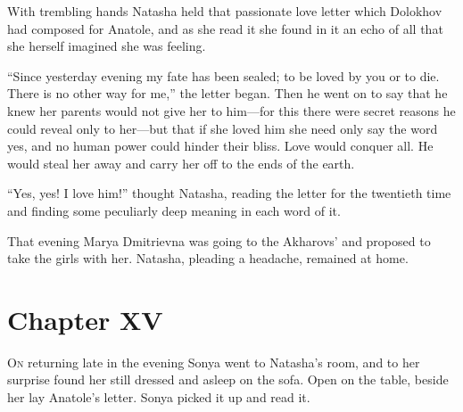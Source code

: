 With trembling hands Natasha held that passionate love letter
which Dolokhov had composed for Anatole, and as she read it she
found in it an echo of all that she herself imagined she was
feeling.

``Since yesterday evening my fate has been sealed; to be loved by
you or to die. There is no other way for me,'' the letter
began. Then he went on to say that he knew her parents would not
give her to him---for this there were secret reasons he could
reveal only to her---but that if she loved him she need only say
the word yes, and no human power could hinder their bliss. Love
would conquer all. He would steal her away and carry her off to
the ends of the earth.

``Yes, yes! I love him!'' thought Natasha, reading the letter for
the twentieth time and finding some peculiarly deep meaning in
each word of it.

That evening Marya Dmitrievna was going to the Akharovs' and
proposed to take the girls with her. Natasha, pleading a
headache, remained at home.


\chapter*{Chapter XV}
\ifaudio     
{} 
\fi

\lettrine[lines=2, loversize=0.3, lraise=0]{\initfamily O}{n}
returning late in the evening Sonya went to Natasha's room,
and to her surprise found her still dressed and asleep on the
sofa. Open on the table, beside her lay Anatole's letter. Sonya
picked it up and read it.

